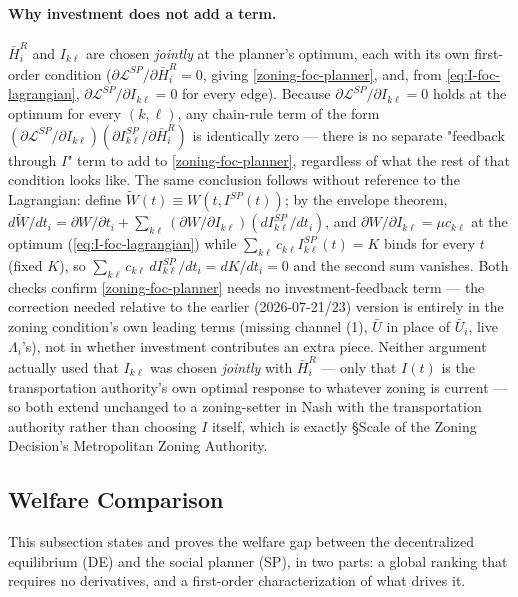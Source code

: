 \documentclass[12pt, a4paper]{article}
\theoremstyle{definition}
\theoremstyle{remark}
\begin{document}
\paragraph{Why investment does not add a term.} $\bar H_i^R$ and $I_{k\ell}$ are chosen \emph{jointly} at the planner's optimum, each with its own first-order condition ($\partial\mathcal L^{SP}/\partial\bar H_i^R=0$, giving \eqref{zoning-foc-planner}, and, from \eqref{eq:I-foc-lagrangian}, $\partial\mathcal L^{SP}/\partial I_{k\ell}=0$ for every edge). Because $\partial\mathcal L^{SP}/\partial I_{k\ell}=0$ holds at the optimum for every $(k,\ell)$, any chain-rule term of the form $(\partial\mathcal L^{SP}/\partial I_{k\ell})(\partial I_{k\ell}^{SP}/\partial\bar H_i^R)$ is identically zero — there is no separate "feedback through $I$" term to add to \eqref{zoning-foc-planner}, regardless of what the rest of that condition looks like. The same conclusion follows without reference to the Lagrangian: define $\tilde W(t)\equiv W(t,I^{SP}(t))$; by the envelope theorem, $d\tilde W/dt_i=\partial W/\partial t_i+\sum_{k\ell}(\partial W/\partial I_{k\ell})(dI_{k\ell}^{SP}/dt_i)$, and $\partial W/\partial I_{k\ell}=\mu c_{k\ell}$ at the optimum (\eqref{eq:I-foc-lagrangian}) while $\sum_{k\ell}c_{k\ell}I_{k\ell}^{SP}(t)=K$ binds for every $t$ (fixed $K$), so $\sum_{k\ell}c_{k\ell}\,dI_{k\ell}^{SP}/dt_i=dK/dt_i=0$ and the second sum vanishes. Both checks confirm \eqref{zoning-foc-planner} needs no investment-feedback term — the correction needed relative to the earlier (2026-07-21/23) version is entirely in the zoning condition's own leading terms (missing channel (1), $\bar U$ in place of $\bar U_i$, live $\Lambda_i$'s), not in whether investment contributes an extra piece. Neither argument actually used that $I_{k\ell}$ was chosen \emph{jointly} with $\bar H_i^R$ — only that $I(t)$ is the transportation authority's own optimal response to whatever zoning is current — so both extend unchanged to a zoning-setter in Nash with the transportation authority rather than choosing $I$ itself, which is exactly \S Scale of the Zoning Decision's Metropolitan Zoning Authority.

\subsection{Welfare Comparison}

This subsection states and proves the welfare gap between the decentralized equilibrium (DE) and the social planner (SP), in two parts: a global ranking that requires no derivatives, and a first-order characterization of what drives it.
\end{document}
